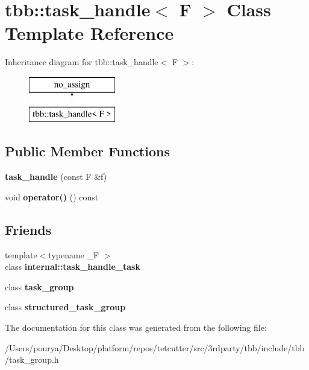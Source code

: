 \hypertarget{classtbb_1_1task__handle}{}\section{tbb\+:\+:task\+\_\+handle$<$ F $>$ Class Template Reference}
\label{classtbb_1_1task__handle}
Inheritance diagram for tbb\+:\+:task\+\_\+handle$<$ F $>$\+:\begin{figure}[H]
\begin{center}
\leavevmode
\includegraphics[height=2.000000cm]{classtbb_1_1task__handle}
\end{center}
\end{figure}
\subsection*{Public Member Functions}
\begin{DoxyCompactItemize}
\item 
\hypertarget{classtbb_1_1task__handle_a1e213e12e1c2d789c22e56901b53b1d2}{}{\bfseries task\+\_\+handle} (const F \&f)\label{classtbb_1_1task__handle_a1e213e12e1c2d789c22e56901b53b1d2}

\item 
\hypertarget{classtbb_1_1task__handle_ab09a19aa92286d48cc42d3e9cd60b5d8}{}void {\bfseries operator()} () const \label{classtbb_1_1task__handle_ab09a19aa92286d48cc42d3e9cd60b5d8}

\end{DoxyCompactItemize}
\subsection*{Friends}
\begin{DoxyCompactItemize}
\item 
\hypertarget{classtbb_1_1task__handle_a70a59090420eb9c76bd067b3ed3f1e72}{}{\footnotesize template$<$typename \+\_\+\+F $>$ }\\class {\bfseries internal\+::task\+\_\+handle\+\_\+task}\label{classtbb_1_1task__handle_a70a59090420eb9c76bd067b3ed3f1e72}

\item 
\hypertarget{classtbb_1_1task__handle_abe85fe1f158cb2a40cd7203854b9460a}{}class {\bfseries task\+\_\+group}\label{classtbb_1_1task__handle_abe85fe1f158cb2a40cd7203854b9460a}

\item 
\hypertarget{classtbb_1_1task__handle_a2913777f78e95f9ea09d788b12db6b62}{}class {\bfseries structured\+\_\+task\+\_\+group}\label{classtbb_1_1task__handle_a2913777f78e95f9ea09d788b12db6b62}

\end{DoxyCompactItemize}


The documentation for this class was generated from the following file\+:\begin{DoxyCompactItemize}
\item 
/\+Users/pourya/\+Desktop/platform/repos/tetcutter/src/3rdparty/tbb/include/tbb/task\+\_\+group.\+h\end{DoxyCompactItemize}
